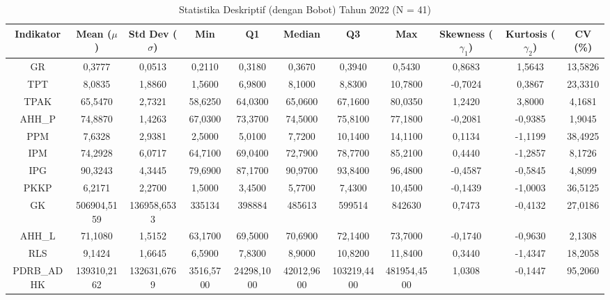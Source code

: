\begin{table}[H]
\centering
\caption{Statistika Deskriptif (dengan Bobot) Tahun 2022 (N = 41)} \label{tab:app1desc_2022}
\begin{adjustbox}{max width=\textwidth, max height=0.85\textheight}
\begin{tabular}{|c|c|c|c|c|c|c|c|c|c|c|}
\hline
\textbf{Indikator} & \textbf{Mean ($\mu$)} & \textbf{Std Dev ($\sigma$)} & \textbf{Min} & \textbf{Q1} & \textbf{Median} & \textbf{Q3} & \textbf{Max} & \textbf{Skewness ($\gamma_1$)} & \textbf{Kurtosis ($\gamma_2$)} & \textbf{CV (\%)} \\
\hline
GR & 0,3777 & 0,0513 & 0,2110 & 0,3180 & 0,3670 & 0,3940 & 0,5430 & 0,8683 & 1,5643 & 13,5826 \\
TPT & 8,0835 & 1,8860 & 1,5600 & 6,9800 & 8,1000 & 8,8300 & 10,7800 & -0,7024 & 0,3867 & 23,3310 \\
TPAK & 65,5470 & 2,7321 & 58,6250 & 64,0300 & 65,0600 & 67,1600 & 80,0350 & 1,2420 & 3,8000 & 4,1681 \\
AHH\_P & 74,8870 & 1,4263 & 67,0300 & 73,3700 & 74,5000 & 75,8100 & 77,1800 & -0,2081 & -0,9385 & 1,9045 \\
PPM & 7,6328 & 2,9381 & 2,5000 & 5,0100 & 7,7200 & 10,1400 & 14,1100 & 0,1134 & -1,1199 & 38,4925 \\
IPM & 74,2928 & 6,0717 & 64,7100 & 69,0400 & 72,7900 & 78,7700 & 85,2100 & 0,4440 & -1,2857 & 8,1726 \\
IPG & 90,3243 & 4,3445 & 79,6900 & 87,1700 & 90,9700 & 93,8400 & 96,4800 & -0,4587 & -0,5845 & 4,8099 \\
PKKP & 6,2171 & 2,2700 & 1,5000 & 3,4500 & 5,7700 & 7,4300 & 10,4500 & -0,1439 & -1,0003 & 36,5125 \\
GK & 506904,5159 & 136958,6533 & 335134 & 398884 & 485613 & 599514 & 842630 & 0,7473 & -0,4132 & 27,0186 \\
AHH\_L & 71,1080 & 1,5152 & 63,1700 & 69,5000 & 70,6900 & 72,1400 & 73,7000 & -0,1740 & -0,9630 & 2,1308 \\
RLS & 9,1424 & 1,6645 & 6,5900 & 7,8300 & 8,9000 & 10,8200 & 11,8400 & 0,3440 & -1,4347 & 18,2058 \\
PDRB\_ADHK & 139310,2162 & 132631,6769 & 3516,5700 & 24298,1000 & 42012,9600 & 103219,4400 & 481954,4500 & 1,0308 & -0,1447 & 95,2060 \\
\hline
\end{tabular}
\end{adjustbox}
\end{table}